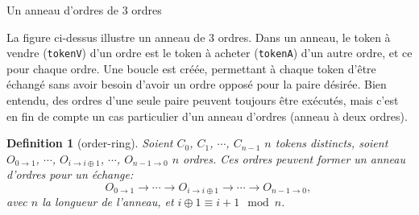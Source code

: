 \documentclass[UTF8,nofonts]{article}
\makeatletter
\newtheorem{definition}{Definition}[section]
\newenvironment{figurehere}
 {\def\@captype{figure}}
 {}
\makeatother
\begin{document}
\begin{multicols}{2}
\begin{center}
\begin{figurehere}

\caption{Un anneau d'ordres de 3 ordres}
\label{fig:ring}
\end{figurehere}
\end{center}


La figure ci-dessus illustre un anneau de 3 ordres. Dans un anneau, le token à vendre (\verb|tokenV|) d'un ordre est le token à acheter (\verb|tokenA|) d'un autre ordre, et ce pour chaque ordre. Une boucle est créée, permettant à chaque token d'être échangé sans avoir besoin d'avoir un ordre opposé pour la paire désirée. Bien entendu, des ordres d'une seule paire peuvent toujours être exécutés, mais c'est en fin de compte un cas particulier d'un anneau d'ordres (anneau à deux ordres). 

\begin{definition}[order-ring] Soient $C_{0}$, $C_{1}$, $\cdots$, $C_{n-1}$  $n$ tokens distincts, soient $O_{0\rightarrow 1}$, $\cdots$, $O_{i\rightarrow i\oplus 1}$, $\cdots$, $O_{n-1 \rightarrow 0}$  $n$ ordres. Ces ordres peuvent former un anneau d'ordres pour un échange:
$$O_{0\rightarrow 1} \rightarrow \cdots \rightarrow O_{i\rightarrow i\oplus 1} \rightarrow \cdots \rightarrow O_{n-1\rightarrow 0} \text{, }$$
avec $n$ la longueur de l'anneau, et $i\oplus 1 \equiv i+1 \mod n$.
\end{definition}


\end{multicols}
\end{document}
